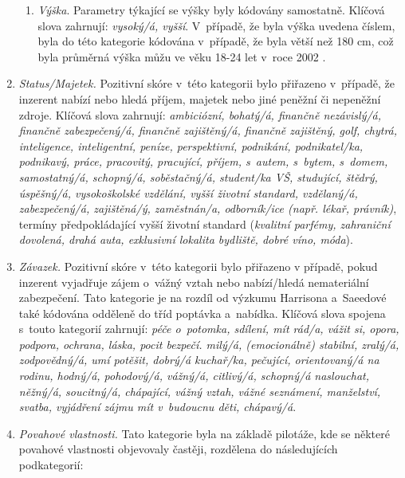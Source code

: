 \documentclass[a4paper, 12pt, notitlepage, oneside, numbers=noenddot]{report}
\begin{document}
\begin{enumerate}
\begin{enumerate}
\item \emph{Výška}. Parametry týkající se výšky byly kódovány samostatně.
  Klíčová slova zahrnují: \emph{vysoký/á, vyšší}. V~případě, že byla výška
  uvedena číslem, byla do této kategorie kódována v~případě, že byla
  větší než 180 cm, což byla průměrná výška můžu ve věku 18-24 let
  v~roce 2002 \citep{UZIS2002}.
\end{enumerate}
\item \emph{Status/Majetek.} Pozitivní skóre v~této kategorii bylo přiřazeno
  v~případě, že inzerent nabízí nebo hledá příjem, majetek nebo jiné
  peněžní či nepeněžní zdroje. Klíčová slova zahrnují:
  \emph{ambiciózní, bohatý/á, finančně nezávislý/á, finančně
    zabezpečený/á, finančně zajištěný/á, finančně zajištěný, golf,
    chytrá, inteligence, inteligentní, peníze, perspektivní,
    podnikání, podnikatel/ka, podnikavý, práce, pracovitý, pracující,
    příjem, s~autem, s~bytem, s~domem, samostatný/á, schopný/á,
    soběstačný/á, student/ka VŠ, studující, štědrý, úspěšný/á,
    vysokoškolské vzdělání, vyšší životní standard, vzdě\-la\-ný/á,
    zabezpečený/á, zajištěná/ý, zaměstnán/a, odborník/ice (např.
    lékař, právník)}, termíny předpokládající vyšší životní standard
  (\emph{kvalitní parfémy, zahraniční dovolená, drahá auta, exklusivní
    lokalita bydliště, dobré víno, móda}).
\item \emph{Závazek.} Pozitivní skóre v~této kategorii bylo přiřazeno v
  případě, pokud inzerent vyjadřuje zájem o~vážný vztah nebo
  nabízí/hledá nemateriální zabezpečení. Tato kategorie je na rozdíl
  od výzkumu Harrisona a~Saeedové \citeyearpar{HarrisonSaeed1977} také kódována odděleně do
  tříd poptávka a~nabídka. Klíčová slova spojena s~touto kategorií
  zahrnují: \emph{péče o~potomka, sdílení, mít rád/a, vážit si, opora,
    podpora, ochrana, láska, pocit bezpečí. milý/á, (emocionálně)
    stabilní, zralý/á, zodpovědný/á, umí potěšit, dobrý/á ku\-chař/ka,
    pečující, orientovaný/á na rodinu, hodný/á, pohodový/á, vážný/á,
    citlivý/á, schopný/á naslouchat, něžný/á, soucitný/á, chápající,
    vážný vztah, vážné seznámení, manželství, svatba, vyjádření zájmu
    mít v~budoucnu děti, chápavý/á}.

\item \emph{Povahové vlastnosti.} Tato kategorie byla na základě pilotáže,
  kde se některé povahové vlastnosti objevovaly častěji, rozdělena do
  následujících podkategorií:


\end{enumerate}
\end{document}
